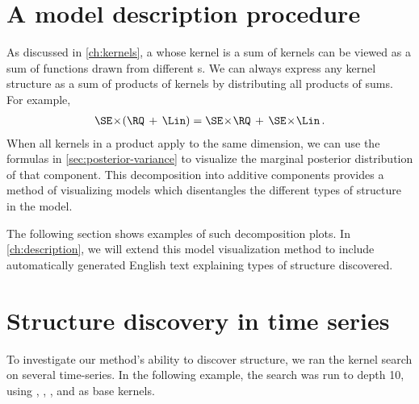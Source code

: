 \section{A model description procedure}

As discussed in \cref{ch:kernels}, a \gp{} whose kernel is a sum of kernels can be viewed as a sum of functions drawn from different \gp{}s.
We can always express any kernel structure as a sum of products of kernels by distributing all products of sums.
For example,
%
\begin{align}
\SE \kerntimes (\RQ \kernplus \Lin) = \SE \kerntimes  \RQ \kernplus \SE \kerntimes \Lin \,.
\end{align}
%
When all kernels in a product apply to the same dimension, we can use the formulas in \cref{sec:posterior-variance} to visualize the marginal posterior distribution of that component.
This decomposition into additive components provides a method of visualizing \gp{} models which disentangles the different types of structure in the model.

The following section shows examples of such decomposition plots.
In \cref{ch:description}, we will extend this model visualization method to include automatically generated English text explaining types of structure discovered.



\section{Structure discovery in time series}
\label{sec:time_series}

To investigate our method's ability to discover structure, we ran the kernel search on several time-series.
In the following example, the search was run to depth 10, using \kSE{}, \kRQ{}, \kLin{}, \kPer{} and \kWN{} as base kernels.

